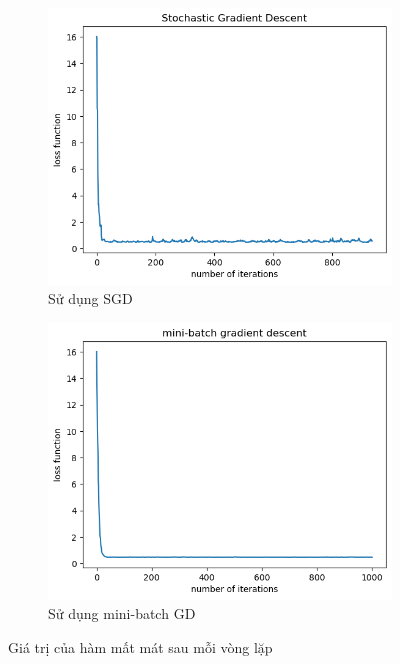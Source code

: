 \documentclass{article}
\begin{document}
\begin{figure}[ht!]
    \centering
    \begin{subfigure}[b]{0.45\linewidth}
        \includegraphics[width = \linewidth]{linear_sgd.png}
        \caption{Sử dụng SGD}
        \label{fig7a}
    \end{subfigure}
    \begin{subfigure}[b]{0.45\linewidth}
        \includegraphics[width = \linewidth]{linear_mgd.png}
        \caption{Sử dụng mini-batch GD}
        \label{fig7b}
    \end{subfigure}
    \caption{Giá trị của hàm mất mát sau mỗi vòng lặp}
    \label{fig7}
\end{figure}
\end{document}
